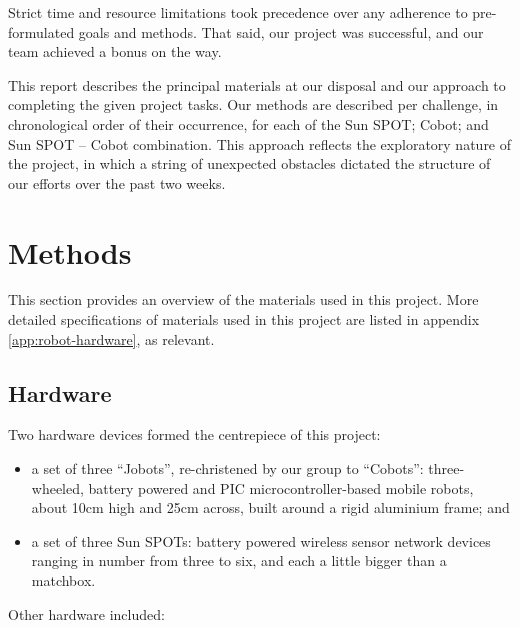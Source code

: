 \documentclass[a4paper,10pt]{article} %
\begin{document}
Strict time and resource limitations took precedence over any adherence
to pre-formulated goals and methods. That said, our project was successful,
and our team achieved a bonus on the way.

This report describes the principal materials at our disposal and our approach
to completing the given project tasks. Our methods are described per challenge,
in chronological order of their occurrence, for each of the Sun SPOT; Cobot; and
Sun SPOT -- Cobot combination. This approach reflects the exploratory nature of
the project, in which a string of unexpected obstacles dictated the structure of
our efforts over the past two weeks.


%
%
%

\pagebreak

\section{Methods} %

This section provides an overview of the materials used in this project. More
detailed specifications of materials used in this project are listed in appendix
\ref{app:robot-hardware}, as relevant.

\subsection{Hardware} %

Two hardware devices formed the centrepiece of this project:

\begin{itemize}
    \item a set of three ``Jobots'', re-christened by our group to
    ``Cobots'': three-wheeled, battery powered and PIC microcontroller-based mobile
    robots, about 10cm high and 25cm across, built around a rigid aluminium frame;
    and
    \item a set of three Sun SPOTs: battery powered wireless sensor network
    devices ranging in number from three to six, and each a little bigger than a
    matchbox.
\end{itemize}

\noindent Other hardware included:
\end{document}
